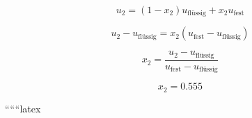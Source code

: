 \begin{equation*}
u_2 = (1 - x_2) u_{\text{flüssig}} + x_2 u_{\text{fest}}
\end{equation*}

\begin{equation*}
u_2 - u_{\text{flüssig}} = x_2 (u_{\text{fest}} - u_{\text{flüssig}})
\end{equation*}

\begin{equation*}
x_2 = \frac{u_2 - u_{\text{flüssig}}}{u_{\text{fest}} - u_{\text{flüssig}}}
\end{equation*}

\begin{equation*}
x_2 = 0.555
\end{equation*}

``````latex